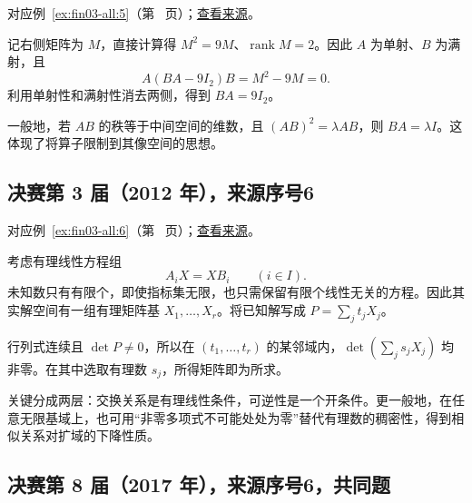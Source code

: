 \documentclass[12pt,fontset=fandol]{ctexart}
\begin{document}
对应例~\ref{ex:fin03-all:5}（第~\pageref{ex:fin03-all:5} 页）；\href{https://github.com/lzxcr/cmc-mathematics/blob/64916fa1fdbc3e444a652eca204d5669058ee321/src/problems/finals/03/05.md}{查看来源}。

\begin{solve}

记右侧矩阵为 $M$，直接计算得 $M^2=9M$、$\operatorname{rank}M=2$。因此 $A$ 为单射、$B$ 为满射，且
\[
A(BA-9I_2)B=M^2-9M=0.
\]
利用单射性和满射性消去两侧，得到 $BA=9I_2$。

\end{solve}

\begin{remark}[方法与条件]

一般地，若 $AB$ 的秩等于中间空间的维数，且 $(AB)^2=\lambda AB$，则 $BA=\lambda I$。这体现了将算子限制到其像空间的思想。

\end{remark}

\subsection{决赛第 3 届（2012 年），来源序号6}\label{ans:fin03-all:6}\label{pr:fin03-all:6}

对应例~\ref{ex:fin03-all:6}（第~\pageref{ex:fin03-all:6} 页）；\href{https://github.com/lzxcr/cmc-mathematics/blob/64916fa1fdbc3e444a652eca204d5669058ee321/src/problems/finals/03/06.md}{查看来源}。

\begin{solve}

考虑有理线性方程组
\[
A_iX=XB_i\qquad(i\in I).
\]
未知数只有有限个，即使指标集无限，也只需保留有限个线性无关的方程。因此其实解空间有一组有理矩阵基 $X_1,\ldots,X_r$。将已知解写成
$P=\sum_j t_jX_j$。

行列式连续且 $\det P\ne0$，所以在 $(t_1,\ldots,t_r)$ 的某邻域内，$\det(\sum_j s_jX_j)$ 均非零。在其中选取有理数 $s_j$，所得矩阵即为所求。

\end{solve}

\begin{remark}[方法与条件]

关键分成两层：交换关系是有理线性条件，可逆性是一个开条件。更一般地，在任意无限基域上，也可用“非零多项式不可能处处为零”替代有理数的稠密性，得到相似关系对扩域的下降性质。

\end{remark}

\subsection{决赛第 8 届（2017 年），来源序号6，共同题}\label{ans:fin08-hi:6}\label{pr:fin08-hi:6}
\end{document}
